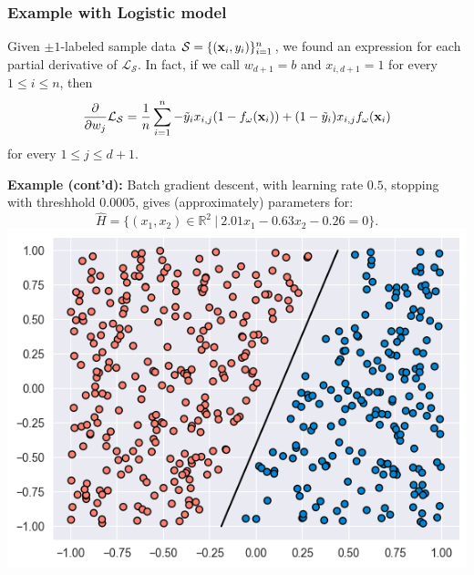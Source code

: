 \documentclass[smaller]{beamer}
\theoremstyle{example}
\begin{document}
\begin{frame}
    \frametitle{Example with Logistic model}
    Given $\pm1$-labeled sample data $\mathcal S= \{({\bf x}_i, y_i)\}_{i=1}^n$, we found an expression for each partial derivative of $\mathcal L_{\mathcal S}$. In fact, if we call $w_{d+1} = b$ and $x_{i,d+1} = 1$ for every $1\le i\le n$, then 
        {\small 
        \[\frac{\partial}{\partial w_{j}}\mathcal L_{\mathcal S} = \frac1n\sum_{i=1}^n-\tilde y_ix_{i,j}(1-f_{\omega}({\bf x}_i)) + (1-\tilde y_i)x_{i,j}f_{\omega}({\bf x}_i)\]
        }
    for every $1\le j\le d+1$.

    \textbf{Example (cont'd):} Batch gradient descent, with learning rate $0.5$, stopping with threshhold $0.0005$, gives (approximately) parameters for: 
        \[\hat{H} = \{(x_1,x_2)\in\mathbb R^2\ |\ 2.01x_1 - 0.63x_2-0.26=0\}.\]
    \centering
    \includegraphics[height=0.3\textheight]{../../Images/Hfit-simulated-logregression-data.png}
\end{frame}
\end{document}
